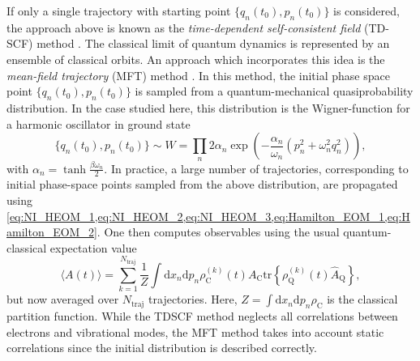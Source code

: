 \documentclass{article}
\newcommand{\dif}{\mathrm{d}}
\newcommand{\tr}[1]{\mathrm{tr}\left\{#1\right\}}
\begin{document}
If only a single trajectory with starting point $\{q_n(t_0),p_n(t_0)\}$ is considered, the approach above is known as the \emph{time-dependent self-consistent field} (TD-SCF) method \cite{stock2005classical}. 
The classical limit of quantum dynamics is represented by an ensemble of classical orbits. An approach which incorporates this idea is the \emph{mean-field trajectory} (MFT) method \cite{stock2005classical}. In this method, the initial phase space point $\{q_n(t_0),p_n(t_0)\}$ is sampled from a quantum-mechanical quasiprobability distribution. In the case studied here, this distribution is the Wigner-function for a harmonic oscillator in ground state 
\begin{equation}
	\{q_n(t_0),p_n(t_0)\}\sim W = \prod_n 2\alpha_n \exp\left(-\frac{\alpha_n}{\omega_n} (p_n^2+\omega^2_n q_n^2)\right),
\end{equation}
with $\alpha_n = \tanh\frac{\beta\omega_n}{2}$.
In practice, a large number of trajectories, corresponding to initial phase-space points sampled from the above distribution, are propagated using \cref{eq:NI_HEOM_1,eq:NI_HEOM_2,eq:NI_HEOM_3,eq:Hamilton_EOM_1,eq:Hamilton_EOM_2}. One then computes observables using the usual quantum-classical expectation value
\begin{equation}
	\langle A(t)\rangle = \sum_{k=1}^{N_\mathrm{traj}}\frac{1}{Z}\int \dif x_n \dif p_n \rho_\mathrm{C}^{(k)}(t) A_\mathrm{C}\tr{\rho^{(k)}_\mathrm{Q}(t)\hat{A}_\mathrm{Q}},
\end{equation}
but now averaged over $N_\mathrm{traj}$ trajectories.
Here, $Z=\int \dif x_n \dif p_n \rho_\mathrm{C}$ is the classical partition function. While the TDSCF method neglects all correlations between electrons and vibrational modes, the MFT method takes into account static correlations since the initial distribution is described correctly. 

\end{document}
